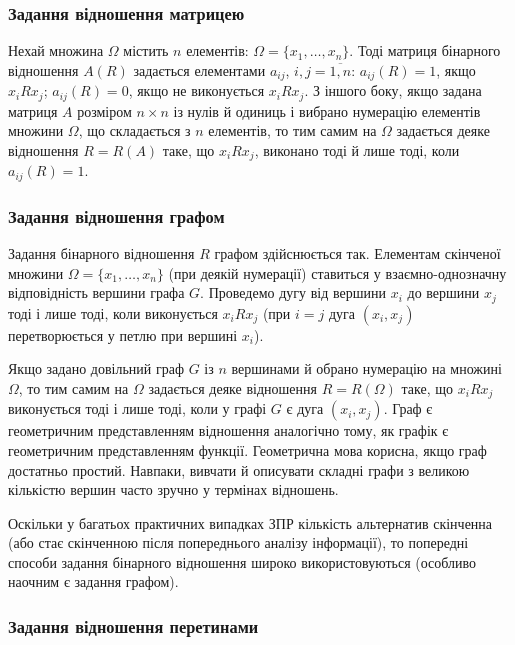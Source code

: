 \subsubsection{Задання відношення матрицею}

Нехай множина $\Omega$ містить $n$ елементів: $\Omega = \{x_1, \ldots, x_n\}$. Тоді матриця бінарного відношення $A(R)$ задається елементами $a_{ij}$, $i, j = \overline{1, n}$: $a_{ij}(R) = 1$, якщо $x_i R x_j$; $a_{ij}(R) = 0$, якщо не виконується $x_i R x_j$. З іншого боку, якщо задана матриця $A$ розміром $n \times n$ із нулів й одиниць і вибрано нумерацію елементів множини $\Omega$, що складається з $n$ елементів, то тим самим на $\Omega$ задається деяке відношення $R = R(A)$ таке, що $x_i R x_j$, виконано тоді й лише тоді, коли $a_{ij}(R) = 1$.

\subsubsection{Задання відношення графом}

Задання бінарного відношення $R$ графом здійснюється так. Елементам скінченої множини $\Omega = \{x_1, \ldots, x_n\}$ (при деякій нумерації) ставиться у взаємно-однозначну відповідність вершини графа $G$. Проведемо дугу від вершини $x_i$ до вершини $x_j$ тоді і лише тоді, коли виконується $x_i R x_j$ (при $i = j$ дуга $(x_i, x_j)$ перетворюється у петлю при вершині $x_i$). \medskip

Якщо задано довільний граф $G$ із $n$ вершинами й обрано нумерацію на множині $\Omega$, то тим самим на $\Omega$ задається деяке відношення $R = R(\Omega)$ таке, що $x_i R x_j$ виконується тоді і лише тоді, коли у графі $G$ є дуга $(x_i, x_j)$. Граф є геометричним представленням відношення аналогічно тому, як графік є геометричним представленням функції. Геометрична мова корисна, якщо граф достатньо простий. Навпаки, вивчати й описувати складні графи з великою кількістю вершин часто зручно у термінах відношень. \medskip

Оскільки у багатьох практичних випадках ЗПР кількість альтернатив скінченна (або стає скінченною після попереднього аналізу інформації), то попередні способи задання бінарного відношення широко використовуються (особливо наочним є задання графом).

\subsubsection{Задання відношення перетинами}

